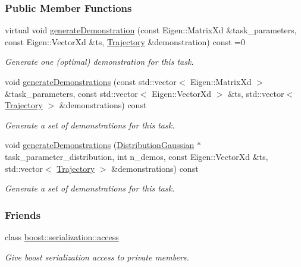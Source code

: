 \subsubsection*{Public Member Functions}
\begin{DoxyCompactItemize}
\item 
virtual void \hyperlink{classDmpBbo_1_1TaskWithTrajectoryDemonstrator_a3f4561d78c6163ff208b776944f347eb}{generate\+Demonstration} (const Eigen\+::\+Matrix\+Xd \&task\+\_\+parameters, const Eigen\+::\+Vector\+Xd \&ts, \hyperlink{classDmpBbo_1_1Trajectory}{Trajectory} \&demonstration) const =0
\begin{DoxyCompactList}\small\item\em Generate one (optimal) demonstration for this task. \end{DoxyCompactList}\item 
void \hyperlink{classDmpBbo_1_1TaskWithTrajectoryDemonstrator_a7378fd00b6255cfb3952edb606ef12b8}{generate\+Demonstrations} (const std\+::vector$<$ Eigen\+::\+Matrix\+Xd $>$ \&task\+\_\+parameters, const std\+::vector$<$ Eigen\+::\+Vector\+Xd $>$ \&ts, std\+::vector$<$ \hyperlink{classDmpBbo_1_1Trajectory}{Trajectory} $>$ \&demonstrations) const 
\begin{DoxyCompactList}\small\item\em Generate a set of demonstrations for this task. \end{DoxyCompactList}\item 
void \hyperlink{classDmpBbo_1_1TaskWithTrajectoryDemonstrator_a5c2d9a04a42b55b5b1249b7a643761e5}{generate\+Demonstrations} (\hyperlink{classDmpBbo_1_1DistributionGaussian}{Distribution\+Gaussian} $\ast$task\+\_\+parameter\+\_\+distribution, int n\+\_\+demos, const Eigen\+::\+Vector\+Xd \&ts, std\+::vector$<$ \hyperlink{classDmpBbo_1_1Trajectory}{Trajectory} $>$ \&demonstrations) const 
\begin{DoxyCompactList}\small\item\em Generate a set of demonstrations for this task. \end{DoxyCompactList}\end{DoxyCompactItemize}
\subsubsection*{Friends}
\begin{DoxyCompactItemize}
\item 
class \hyperlink{classDmpBbo_1_1TaskWithTrajectoryDemonstrator_ac98d07dd8f7b70e16ccb9a01abf56b9c}{boost\+::serialization\+::access}
\begin{DoxyCompactList}\small\item\em Give boost serialization access to private members. \end{DoxyCompactList}\end{DoxyCompactItemize}


